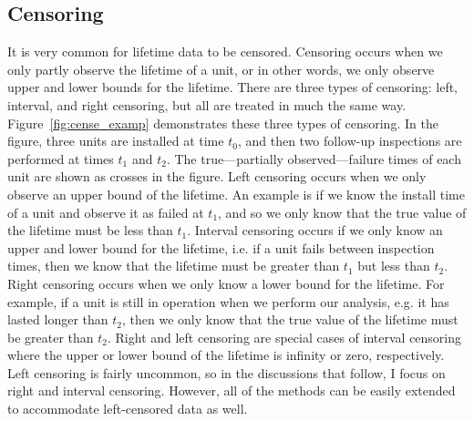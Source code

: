 \subsection{Censoring} \label{subsec:censoring-treatments}

It is very common for lifetime data to be censored. Censoring occurs when we only partly observe the lifetime of a unit, or in other words, we only observe upper and lower bounds for the lifetime. There are three types of censoring: left, interval, and right censoring, but all are treated in much the same way. Figure~\ref{fig:cense_examp} demonstrates these three types of censoring. In the figure, three units are installed at time $t_0$, and then two follow-up inspections are performed at times $t_1$ and $t_2$. The true---partially observed---failure times of each unit are shown as crosses in the figure. Left censoring occurs when we only observe an upper bound of the lifetime. An example is if we know the install time of a unit and observe it as failed at $t_1$, and so we only know that the true value of the lifetime must be less than $t_1$. Interval censoring occurs if we only know an upper and lower bound for the lifetime, i.e. if a unit fails between inspection times, then we know that the lifetime must be greater than $t_1$ but less than $t_2$. Right censoring occurs when we only know a lower bound for the lifetime. For example, if a unit is still in operation when we perform our analysis, e.g. it has lasted longer than $t_2$, then we only know that the true value of the lifetime must be greater than $t_2$. Right and left censoring are special cases of interval censoring where the upper or lower bound of the lifetime is infinity or zero, respectively. Left censoring is fairly uncommon, so in the discussions that follow, I focus on right and interval censoring. However, all of the methods can be easily extended to accommodate left-censored data as well.

